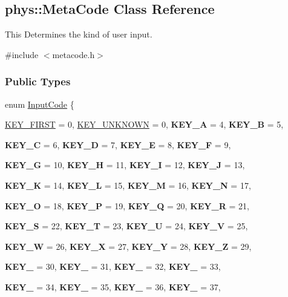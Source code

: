 \hypertarget{classphys_1_1MetaCode}{
\subsection{phys::MetaCode Class Reference}
\label{da/dc9/classphys_1_1MetaCode}
}


This Determines the kind of user input.  




{\ttfamily \#include $<$metacode.h$>$}

\subsubsection*{Public Types}
\begin{DoxyCompactItemize}
\item 
enum \hyperlink{classphys_1_1MetaCode_a3e501cbb5bf0f6f1fdb7211465bda8d8}{InputCode} \{ \par
\hyperlink{classphys_1_1MetaCode_a3e501cbb5bf0f6f1fdb7211465bda8d8a45d7f3824a440f5bea5e616a6d6ea0b5}{KEY\_\-FIRST} =  0, 
\hyperlink{classphys_1_1MetaCode_a3e501cbb5bf0f6f1fdb7211465bda8d8a061a36c9b5d9661314fd9d276b33042f}{KEY\_\-UNKNOWN} =  0, 
{\bfseries KEY\_\-A} =  4, 
{\bfseries KEY\_\-B} =  5, 
\par
{\bfseries KEY\_\-C} =  6, 
{\bfseries KEY\_\-D} =  7, 
{\bfseries KEY\_\-E} =  8, 
{\bfseries KEY\_\-F} =  9, 
\par
{\bfseries KEY\_\-G} =  10, 
{\bfseries KEY\_\-H} =  11, 
{\bfseries KEY\_\-I} =  12, 
{\bfseries KEY\_\-J} =  13, 
\par
{\bfseries KEY\_\-K} =  14, 
{\bfseries KEY\_\-L} =  15, 
{\bfseries KEY\_\-M} =  16, 
{\bfseries KEY\_\-N} =  17, 
\par
{\bfseries KEY\_\-O} =  18, 
{\bfseries KEY\_\-P} =  19, 
{\bfseries KEY\_\-Q} =  20, 
{\bfseries KEY\_\-R} =  21, 
\par
{\bfseries KEY\_\-S} =  22, 
{\bfseries KEY\_\-T} =  23, 
{\bfseries KEY\_\-U} =  24, 
{\bfseries KEY\_\-V} =  25, 
\par
{\bfseries KEY\_\-W} =  26, 
{\bfseries KEY\_\-X} =  27, 
{\bfseries KEY\_\-Y} =  28, 
{\bfseries KEY\_\-Z} =  29, 
\par
{\bfseries KEY\_} =  30, 
{\bfseries KEY\_} =  31, 
{\bfseries KEY\_} =  32, 
{\bfseries KEY\_} =  33, 
\par
{\bfseries KEY\_} =  34, 
{\bfseries KEY\_} =  35, 
{\bfseries KEY\_} =  36, 
{\bfseries KEY\_} =  37, 
\par

\end{DoxyCompactItemize}
